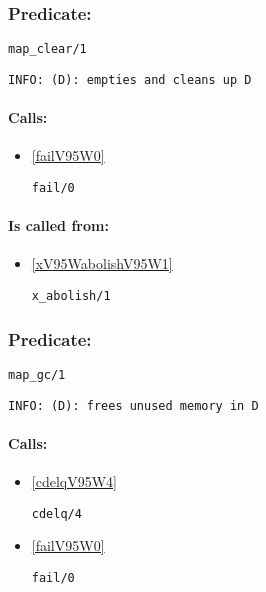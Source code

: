 \subsubsection{Predicate:} \label{mapV95WclearV95W1}

\begin{verbatim}
map_clear/1
\end{verbatim}

{\small \begin{verbatim}
INFO: (D): empties and cleans up D

\end{verbatim}}
\paragraph{Calls:} 
\begin{itemize}
\item \ref{failV95W0} 
\begin{verbatim}
fail/0
\end{verbatim}

\end{itemize}
\paragraph{Is called from:} 
\begin{itemize}
\item \ref{xV95WabolishV95W1} 
\begin{verbatim}
x_abolish/1
\end{verbatim}

\end{itemize}

\subsubsection{Predicate:} \label{mapV95WgcV95W1}

\begin{verbatim}
map_gc/1
\end{verbatim}

{\small \begin{verbatim}
INFO: (D): frees unused memory in D

\end{verbatim}}
\paragraph{Calls:} 
\begin{itemize}
\item \ref{cdelqV95W4} 
\begin{verbatim}
cdelq/4
\end{verbatim}

\item \ref{failV95W0} 
\begin{verbatim}
fail/0
\end{verbatim}

\end{itemize}

